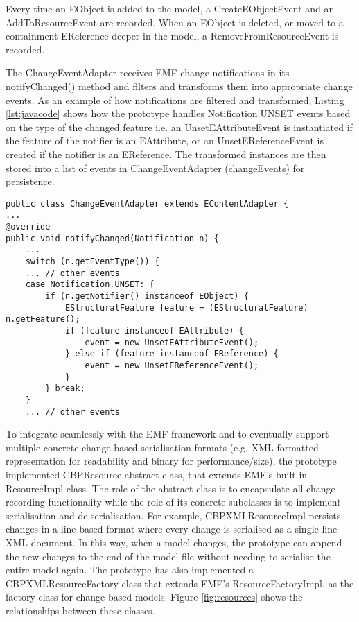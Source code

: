 Every time an \textsf{EObject} is added to the model, a \textsf{CreateEObjectEvent} and an \textsf{AddToResourceEvent} are recorded. When an EObject is deleted, or moved to a containment \textsf{EReference} deeper in the model, a \textsf{RemoveFromResourceEvent}
 is recorded.

The \textsf{ChangeEventAdapter} receives EMF change notifications in its \textsf{notifyChanged()} method and filters and transforms them into appropriate change events. As an example of how notifications are filtered and transformed, Listing \ref{lst:javacode} shows how the prototype handles \textsf{Notification.UNSET} events based on the type of the changed feature i.e. an \textsf{UnsetEAttributeEvent} is instantiated if the feature of the notifier is an \textsf{EAttribute}, or an \textsf{UnsetEReferenceEvent}  is created if the notifier is an \textsf{EReference}. The transformed instances are then stored into a list of events in \textsf{ChangeEventAdapter} (\textsf{changeEvents}) for persistence. 

\begin{lstlisting}[style=java,caption={Simplified Java code to handle notification events.},label=lst:javacode]
public class ChangeEventAdapter extends EContentAdapter {
...
@override
public void notifyChanged(Notification n) {
    ...
    switch (n.getEventType()) {
    ... // other events
    case Notification.UNSET: {
        if (n.getNotifier() instanceof EObject) {
            EStructuralFeature feature = (EStructuralFeature) n.getFeature();
            if (feature instanceof EAttribute) {
                event = new UnsetEAttributeEvent();
            } else if (feature instanceof EReference) {
                event = new UnsetEReferenceEvent();
            }
        } break;
    } 
    ... // other events
\end{lstlisting}	

To integrate seamlessly with the EMF framework and to eventually support multiple concrete change-based serialisation formats (e.g. XML-formatted representation for readability and binary for performance/size), the prototype implemented \textsf{CBPResource} abstract class, that extends EMF's built-in \textsf{ResourceImpl} class. The role of the abstract class is to encapsulate all change recording functionality while the role of its concrete subclasses is to implement serialisation and de-serialisation. For example, \textsf{CBPXMLResourceImpl} persists changes in a line-based format where every change is serialised as a single-line XML document. In this way, when a model changes, the prototype can append the new changes to the end of the model file without needing to serialise the entire model again. The prototype has also implemented a \textsf{CBPXMLResourceFactory} class that extends EMF's \textsf{ResourceFactoryImpl}, as the factory class for change-based models. Figure \ref{fig:resources} shows the relationships between these classes.

